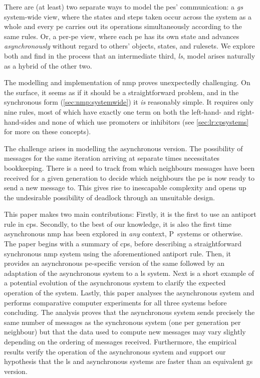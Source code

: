 There are (at least) two separate ways to model the \glspl{pe}' communication:  a \emph{\gls{gs}} system-wide view, where the states and steps taken occur across the system as a whole and every \gls{pe} carries out its operations simultaneously according to the same rules.  Or, a per-\gls{pe} view, where each \gls{pe} has its own state and advances \emph{asynchronously} without regard to others' objects, states, and rulesets.  We explore both and find in the process that an intermediate third, \emph{\gls{ls}}, model arises naturally as a hybrid of the other two.

The modelling and implementation of \gls{nmp} proves unexpectedly challenging.  On the surface, it seems as if it should be a straightforward problem, and in the synchronous form (\cref{sec:nmp:systemwide}) it \emph{is} reasonably simple.  It requires only nine rules, most of which have exactly one term on both the left-hand- and right-hand-sides and none of which use promoters or inhibitors (see \cref{sec:lr:cpsystems} for more on these concepts).

The challenge arises in modelling the asynchronous version.  The possibility of messages for the same iteration arriving at separate times necessitates bookkeeping.  There is a need to track from which neighbours messages have been received for a given generation to decide which neighbours the \gls{pe} is now ready to send a new message to.  This gives rise to inescapable complexity and opens up the undesirable possibility of deadlock through an unsuitable design.

This paper makes two main contributions:  Firstly, it is the first to use an antiport rule in \gls{cps}.  Secondly, to the best of our knowledge, it is also the first time asynchronous \gls{nmp} has been explored in \emph{any} context, P~systems or otherwise.  The paper begins with a summary of \gls{cps}, before describing a straightforward synchronous \gls{nmp} system using the aforementioned antiport rule.  Then, it provides an asynchronous \gls{pe}-specific version of the same followed by an adaptation of the asynchronous system to a \gls{ls} system. Next is a short example of a potential evolution of the asynchronous system to clarify the expected operation of the system.  Lastly, this paper analyses the asynchronous system and performs comparative computer experiments for all three systems before concluding.  The analysis proves that the asynchronous system sends precisely the same number of messages as the synchronous system (one per generation per neighbour) but that the data used to compute new messages may vary slightly depending on the ordering of messages received.  Furthermore, the empirical results verify the operation of the asynchronous system and support our hypothesis that the \gls{ls} and asynchronous systems are faster than an equivalent \gls{gs} version.